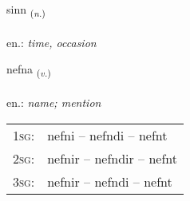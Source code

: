 \documentclass[frontgrid, backgrid]{flacards}\usepackage[]{graphicx}\usepackage[]{xcolor}
\begin{document}
\renewcommand{\blhead}{\vskip5pt {\small\bfseries\footnotesize Nafnorð | Noun }}
\renewcommand{\bcfoot}{\vskip5pt \hspace{2pt}{\small\bfseries\footnotesize 1K}}


{sinn \small{\textsubscript{(\textit{n.})}} \\[1ex] %
\textphonetic{[sɪn]} \\
en.: \emph{time, occasion} \\  [2ex]
\renewcommand*{\arraystretch}{0.8}
}

\renewcommand{\flhead}{\vskip5pt \fboxsep=0pt {\small\bfseries\footnotesize Sagnorð | Verb}}
\renewcommand{\fcfoot}{\vskip5pt \fboxsep=0pt \hspace{2pt}{\small\bfseries\footnotesize 1K}}

\renewcommand{\blhead}{\vskip5pt {\small\bfseries\footnotesize Sagnorð | Verb }}
\renewcommand{\bcfoot}{\vskip5pt \hspace{2pt}{\small\bfseries\footnotesize 1K}}


{nefna \small{\textsubscript{(\textit{v.})}} \\[1ex] %
\textphonetic{[nɛpna]} \\
en.: \emph{name; mention} \\  [2ex]
\renewcommand*{\arraystretch}{0.8}
\begin{tabular}{p{1cm}l}
\textsc{1sg}: & nefni -- nefndi -- nefnt \\ 
\textsc{2sg}: & nefnir -- nefndir -- nefnt \\ 
\textsc{3sg}: & nefnir -- nefndi -- nefnt \\ 
\end{tabular}
}

\renewcommand{\flhead}{\vskip5pt \fboxsep=0pt {\small\bfseries\footnotesize Nafnorð | Noun}}
\renewcommand{\fcfoot}{\vskip5pt \fboxsep=0pt \hspace{2pt}{\small\bfseries\footnotesize 1K}}
\end{document}
